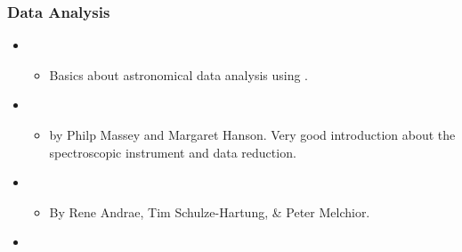 \documentclass[letterpaper,10pt,english]{sphinxmanual}
\begin{document}
\subsubsection{Data Analysis}
\label{\detokenize{resource/astro/astro_readme:data-analysis}}\begin{itemize}
\item {} 
\begin{itemize}
\item {} 
Basics about astronomical data analysis using .

\end{itemize}

\item {} 
\begin{itemize}
\item {} 
by Philp Massey and Margaret Hanson. Very good introduction about
the spectroscopic instrument and data reduction.

\end{itemize}

\item {} 
\begin{itemize}
\item {} 
By Rene Andrae, Tim Schulze-Hartung, \& Peter Melchior.

\end{itemize}

\item {} 

\end{itemize}
\end{document}
